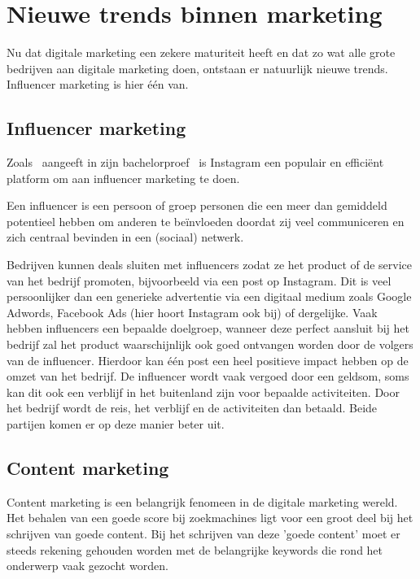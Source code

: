 \section{Nieuwe trends binnen marketing} \label{sec:nieuwe-trends-marketing}
Nu dat digitale marketing een zekere maturiteit heeft en dat zo wat alle grote bedrijven aan digitale marketing doen, ontstaan er natuurlijk nieuwe trends. Influencer marketing is hier één van.

\subsection{Influencer marketing} \label{sec:influencer-marketing}
Zoals~\textcite{Pieters2018} aangeeft in zijn bachelorproef~ is Instagram een populair en efficiënt platform om aan influencer marketing te doen. 

Een influencer is een persoon of groep personen die een meer dan gemiddeld potentieel hebben om anderen te beïnvloeden doordat zij veel communiceren en zich centraal bevinden in een (sociaal) netwerk.~\autocite{Pieters2018}

Bedrijven kunnen deals sluiten met influencers zodat ze het product of de service van het bedrijf promoten, bijvoorbeeld via een post op Instagram. Dit is veel persoonlijker dan een generieke advertentie via een digitaal medium zoals Google Adwords, Facebook Ads (hier hoort Instagram ook bij) of dergelijke. Vaak hebben influencers een bepaalde doelgroep, wanneer deze perfect aansluit bij het bedrijf zal het product waarschijnlijk ook goed ontvangen worden door de volgers van de influencer. Hierdoor kan één post een heel positieve impact hebben op de omzet van het bedrijf. De influencer wordt vaak vergoed door een geldsom, soms kan dit ook een verblijf in het buitenland zijn voor bepaalde activiteiten. Door het bedrijf wordt de reis, het verblijf en de activiteiten dan betaald. Beide partijen komen er op deze manier beter uit.


\subsection{Content marketing} \label{sec:content-marketing}
Content marketing is een belangrijk fenomeen in de digitale marketing wereld. Het behalen van een goede score bij zoekmachines ligt voor een groot deel bij het schrijven van goede content. Bij het schrijven van deze 'goede content' moet er steeds rekening gehouden worden met de belangrijke keywords die rond het onderwerp vaak gezocht worden. 

